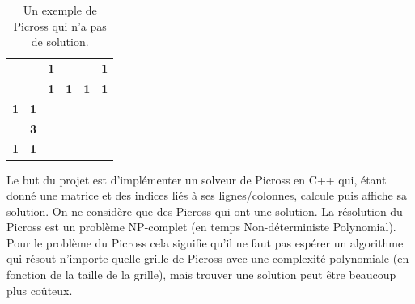 \documentclass{article}
\begin{document}
\begin{table}[h]
\centering
\begin{tabular}{cccccc}
                   &                                 & \textbf{1}                                                           & \textbf{}                                     & \textbf{}                                     & \textbf{1}                                                           \\
                   & \textbf{}                       & \textbf{1}                                                           & \textbf{1}                                    & \textbf{1}                                    & \textbf{1}                                                           \\ \cline{3-6} 
\textbf{1}         & \multicolumn{1}{c|}{\textbf{1}} & \multicolumn{1}{c|}{\cellcolor[HTML]{000000}}                        & \multicolumn{1}{c|}{}                         & \multicolumn{1}{c|}{}                         & \multicolumn{1}{c|}{\cellcolor[HTML]{000000}}                        \\ \cline{3-6} 
\textit{\textbf{}} & \multicolumn{1}{c|}{\textbf{3}} & \multicolumn{1}{c|}{\cellcolor[HTML]{C0C0C0}{\color[HTML]{9B9B9B} }} & \multicolumn{1}{c|}{\cellcolor[HTML]{000000}} & \multicolumn{1}{c|}{\cellcolor[HTML]{000000}} & \multicolumn{1}{c|}{\cellcolor[HTML]{C0C0C0}{\color[HTML]{9B9B9B} }} \\ \cline{3-6} 
\textbf{1}         & \multicolumn{1}{c|}{\textbf{1}} & \multicolumn{1}{c|}{\cellcolor[HTML]{000000}}                        & \multicolumn{1}{c|}{}                         & \multicolumn{1}{c|}{}                         & \multicolumn{1}{c|}{\cellcolor[HTML]{000000}}                        \\ \cline{3-6} 
\end{tabular}
\caption{Un exemple de Picross qui n'a pas de solution.}
\end{table}
\newpage


Le but du projet est d'implémenter un solveur de Picross en C++ qui, étant donné une matrice et des indices liés à ses lignes/colonnes, calcule puis affiche sa solution. On ne considère que des Picross qui ont une solution.\newline
La résolution du Picross est un problème NP-complet (en temps Non-déterministe Polynomial). Pour le problème du Picross cela signifie qu'il ne faut pas espérer un algorithme qui résout n'importe quelle grille de Picross avec une complexité polynomiale (en fonction de la taille de la grille), mais trouver une solution peut être beaucoup plus coûteux.
\end{document}
